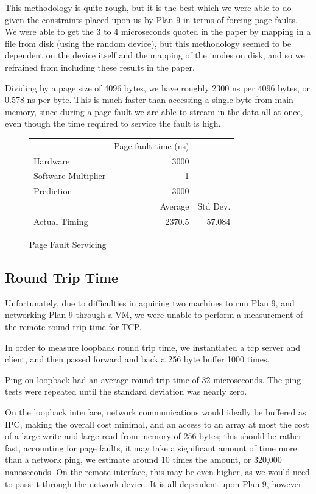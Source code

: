 \documentclass[letterpaper,twocolumn,10pt]{article}
\begin{document}
This methodology is quite rough, but it is the best which we were able to do given the constraints placed upon 
us by Plan 9 in terms of forcing page faults. We were able to get the 3 to 4 microseconds quoted in the paper by mapping in a file from disk (using the random device), but this methodology seemed to be dependent on the device itself and the mapping of the inodes on disk, and so we refrained from including these results in the paper.

Dividing by a page size of 4096 bytes, we have roughly 2300 ns per 4096 bytes, or 0.578 ns per byte. This is much faster than accessing a single byte from main memory, since during a page fault we are able to stream in the data all at once, even though the time required to service the fault is high.

\begin{figure}
	\centering
    \begin{tabular}{l r r}
      & Page fault time (ns) \\
      Hardware & 3000\\
      Software Multiplier & 1 \\
      Prediction & $3000$ \\
                   & Average & Std Dev.\\
      Actual Timing & 2370.5 & 57.084 \\
\end{tabular}
\caption{Page Fault Servicing}
\label{tab:pagefault}
\end{figure}
\subsection{Round Trip Time}
Unfortunately, due to difficulties in aquiring two machines to run Plan 9, and networking Plan 9 through a VM, we were unable to perform a measurement of the remote round trip time for TCP.

In order to measure loopback round trip time, we instantiated a tcp server and client, and then passed forward and back a 256 byte buffer 1000 times. 

Ping on loopback had an average round trip time of 32 microseconds. The ping tests were repeated until the standard deviation was nearly zero. 

On the loopback interface, network communications would ideally be buffered as IPC, making the overall cost minimal, and an access to an array at most the cost of a large write and large read from memory of 256 bytes; this should be rather fast, accounting for page faults, it may take a significant amount of time more than a network ping, we estimate around 10 times the amount, or 320,000 nanoseconds. On the remote interface, this may be even higher, as we would need to pass it through
the network device. It is all dependent upon Plan 9, however.
\end{document}
